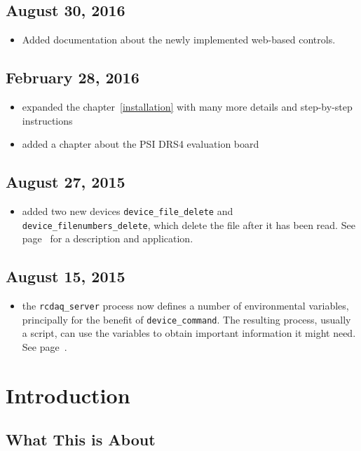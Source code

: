 \documentclass{article}[11pt]
\begin{document}
\subsection{August 30, 2016}
\begin{itemize}
\item Added documentation about the newly implemented web-based controls. 
\end{itemize}

\subsection{February 28, 2016}
\begin{itemize}
\item expanded the chapter~\ref{installation} with many more details
  and step-by-step instructions
\item  added a chapter about the PSI DRS4 evaluation board 
\end{itemize}

\subsection{August 27, 2015}
\begin{itemize}
\item  added two new devices \verb|device_file_delete| and
  \verb|device_filenumbers_delete|, which
  delete the file after it has been read. See page~\pageref{delete} for a description and application.
\end{itemize}

\subsection{August 15, 2015}
\begin{itemize}
\item the \verb|rcdaq_server| process now defines a number of environmental
  variables, principally for the benefit of  \verb|device_command|. The
  resulting process, usually a script, can use the variables to obtain important
  information it might need. See page~\pageref{environment}.
\end{itemize}

\newpage

\section{Introduction}


\subsection{What This is About}
\end{document}
